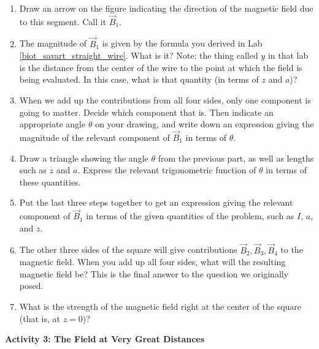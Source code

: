 \begin{enumerate}[leftmargin=0in, labelwidth=*, align=left, labelsep=0in, widest=a, itemindent=\labelwidth, label=(\emph{\alph*})]

\item Draw an arrow on the figure indicating the 
direction of the magnetic field due to this segment.
Call it $\vec{B}_1$.

\item The magnitude of $\vec{B}_1$ is given by the formula
you derived in Lab \ref{biot_savart_straight_wire}. What is it? Note: the thing
called $y$ in that lab is the distance from the center of
the wire to the point at which the field is being evaluated. 
In this case, what is that quantity (in terms of $z$ and $a$)?
\answerspace{0.7in}

\item When we add up the contributions from all four sides, only
one component is going to matter.  Decide which
component that is. Then indicate an
appropriate angle $\theta$ on your drawing, and 
write down an expression giving
the magnitude of the relevant component of $\vec{B}_1$ in terms of $\theta$.  
\answerspace{0.7in}

\item Draw a triangle showing the angle $\theta$ from the previous part,
as well as lengths such as $z$ and $a$.  Express the relevant trigonometric
function of $\theta$ in terms of these quantities.
\answerspace{0.7in}

\item Put the last three steps together to get an expression giving the
relevant component of $\vec{B}_1$ in terms of the given quantities of the
problem, such as $I$, $a$, and $z$.  
\answerspace{0.7in}

\item \label{answer2}
The other three sides of the square will give contributions
$\vec{B}_2,\vec{B}_3,\vec{B}_4$ to the magnetic field.  When you add
up all four sides, what will the resulting magnetic field be?
This is the final answer to the question we originally posed.
\answerspace{0.7in}

\item What is the strength of the magnetic field right at the
center of the square (that is, at $z=0$)?
\answerspace{0.7in}

\end{enumerate}

\pagebreak[2]
\textbf{Activity 3: The Field at Very Great Distances}

